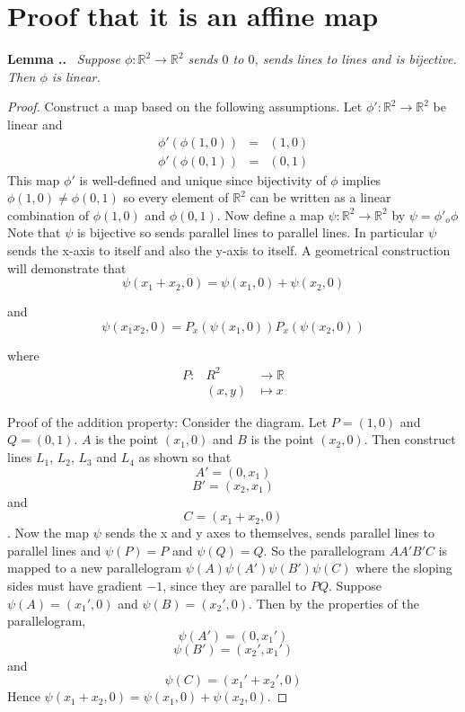\documentclass[honours]{UNSWthesis}
\newcommand{\R}{\mathbb{R}}
\newcommand{\1}{\mathbf{e}_{1}}
\newcommand{\2}{\mathbf{e}_{3}}
\newcommand{\3}{\mathbf{e}_{3}}
\newcounter{Item}[section]
\newenvironment{Lemma}{\medskip
                            \refstepcounter{Item}
                            \noindent
                           {\bf Lemma \thesection.\theItem.}\ %
                            \begingroup \sl}
                           {\endgroup\medskip}
\begin{document}
\section{Proof that it is an affine map}
\begin{Lemma}
Suppose $\phi: \R^{2} \longrightarrow \R^{2}$ sends $0$ to $0$, sends lines to lines and is bijective. Then $\phi$ is linear. 
\end{Lemma}

\begin{proof}
Construct a map based on the following assumptions. Let $\phi': \R^{2} \longrightarrow \R^{2}$ be linear and
\begin{eqnarray*}
\phi'(\phi(1,0))&=& (1,0)\\
\phi'(\phi(0,1)) &=& (0,1)
\end{eqnarray*}
This map $\phi'$ is well-defined and unique since bijectivity of $\phi$ implies $\phi(1,0) \neq \phi(0,1)$ so every element of $\R^{2}$ can be written as a linear combination of $\phi(1,0)$ and $\phi(0,1)$. 
Now define a map $\psi: \R^{2} \longrightarrow \R^{2}$ by $\psi= \phi'_{o}\phi$
Note that $\psi$ is bijective so sends parallel lines to parallel lines. In particular $\psi$ sends the x-axis to itself and also the y-axis to itself.
A geometrical construction will demonstrate that
\begin{equation}
\psi(x_{1}+x_{2},0)=\psi(x_{1},0)+\psi(x_{2},0)
\end{equation}

and 
\begin{equation}
\psi(x_{1}x_{2},0)=P_{x}(\psi(x_{1},0))P_{x}(\psi(x_{2},0))
\end{equation}


where 
\begin{eqnarray*}
P: &R^{2}& \longrightarrow \R \\
&(x,y)& \longmapsto x
\end{eqnarray*}

Proof of the addition property:
Consider the diagram. Let $P=(1,0)$ and $Q=(0,1)$. $A$ is the point $(x_{1},0)$ and $B$ is the point $(x_{2},0)$. Then construct lines $L_{1}$, $L_{2}$, $L_{3}$ and $L_{4}$ as shown so that $$A'=(0,x_{1})$$ $$B'=(x_{2}, x_{1})$$ and $$C=(x_{1}+x_{2},0)$$. Now the map $\psi$ sends the x and y axes to themselves, sends parallel lines to parallel lines and $\psi(P)=P$ and $\psi(Q)=Q$. So the parallelogram $AA'B'C$ is mapped to a new parallelogram $\psi(A)\psi(A')\psi(B')\psi(C)$ where the sloping sides must have gradient $-1$, since they are parallel to $PQ$. Suppose $\psi(A)=(x_{1}',0)$ and $\psi(B)=(x_{2}',0)$. Then by the properties of the parallelogram, 
\[
\psi(A')=(0,x_{1}')
\]
\[
\psi(B')=(x_{2}',x_{1}')
\]
and 
\[
\psi(C)=(x_{1}'+x_{2}',0)
\]
Hence $\psi(x_{1}+x_{2},0)=\psi(x_{1},0)+\psi(x_{2},0)$.


\end{proof}
\end{document}
